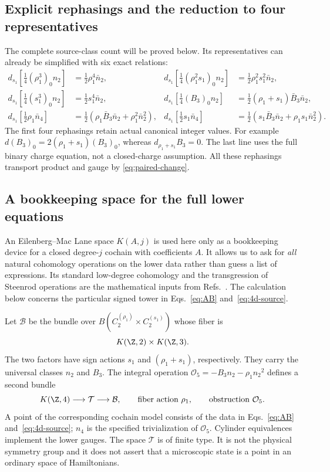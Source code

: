 \subsection{Explicit rephasings and the reduction to four representatives}
The complete source-class count will be proved below. Its representatives can already be simplified with six exact relations:
\begin{align}\label{eq:ansatzexact04}
 d_{s_1}\left[\frac14(\rho_1^3)_0n_2\right]&=\frac12\rho_1^4\bar n_2,
&d_{s_1}\left[\frac14(\rho_1^2s_1)_0n_2\right]&=\frac12\rho_1^2s_1^2\bar n_2,\nonumber\\
 d_{s_1}\left[\frac14(s_1^3)_0n_2\right]&=\frac12s_1^4\bar n_2,
&d_{s_1}\left[\frac14(B_3)_0n_2\right]&=\frac12(\rho_1+s_1)\bar B_3\bar n_2,\\
 d_{s_1}\left[\frac12\rho_1\bar n_4\right]&=\frac12(\rho_1\bar B_3\bar n_2+\rho_1^2\bar n_2^2),
&d_{s_1}\left[\frac12s_1\bar n_4\right]&=\frac12(s_1\bar B_3\bar n_2+\rho_1s_1\bar n_2^2).
\label{eq:ansatzlower04}
\end{align}
The first four rephasings retain actual canonical integer values. For example $d(B_3)_0=2(\rho_1+s_1)(B_3)_0$, whereas $d_{\rho_1+s_1}B_3=0$. The last line uses the full binary charge equation, not a closed-charge assumption. All these rephasings transport product and gauge by \eqref{eq:paired-change}.

\subsection{A bookkeeping space for the full lower equations}
An Eilenberg--Mac Lane space $K(A,j)$ is used here only as a bookkeeping device for a closed degree-$j$ cochain with coefficients $A$. It allows us to ask for \emph{all} natural cohomology operations on the lower data rather than guess a list of expressions. Its standard low-degree cohomology and the transgression of Steenrod operations are the mathematical inputs from Refs.~\cite{SerreEM,HatcherSS,SteenrodEpstein}. The calculation below concerns the particular signed tower in Eqs.~\eqref{eq:AB} and~\eqref{eq:4d-source}.

Let $\mathcal B$ be the bundle over $B(C_2^{({\rho_1})}\times C_2^{({s_1})})$ whose fiber is
\begin{equation}
 K(\Z,2)\times K(\Z,3).
\end{equation}
The two factors have sign actions ${s_1}$ and $(\rho_1+s_1)$, respectively. They carry the universal classes ${n_2}$ and ${B_3}$. The integral operation $\mathcal O_5=-{B_3}{n_2}-{\rho_1}{n_2}^2$ defines a second bundle
\begin{equation}\label{eq:T05}
 K(\Z,4)\longrightarrow\mathcal T\longrightarrow\mathcal B,
 \qquad \text{fiber action }{\rho_1},\qquad\text{obstruction }\mathcal O_5.
\end{equation}
A point of the corresponding cochain model consists of the data in Eqs.~\eqref{eq:AB} and~\eqref{eq:4d-source}; ${n_4}$ is the specified trivialization of $\mathcal O_5$. Cylinder equivalences implement the lower gauges. The space $\mathcal T$ is of finite type. It is not the physical symmetry group and it does not assert that a microscopic state is a point in an ordinary space of Hamiltonians.

